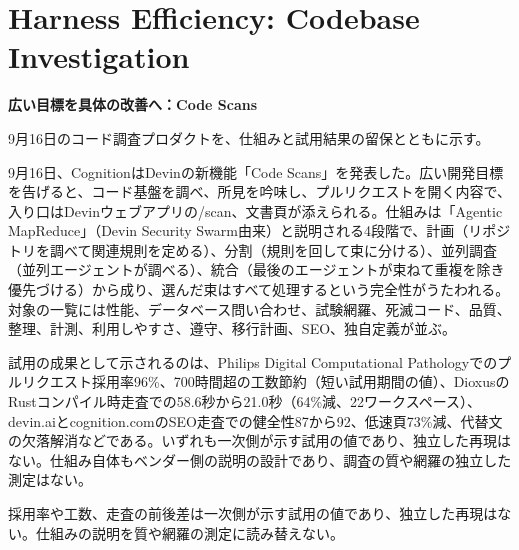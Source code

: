 \section{Harness Efficiency: Codebase Investigation}
\begin{wideflow}
{\Large\bfseries 広い目標を具体の改善へ：Code Scans}\par
\smallskip
{\color{SurveyMuted}9月16日のコード調査プロダクトを、仕組みと試用結果の留保とともに示す。}\par
\end{wideflow}

9月16日、CognitionはDevinの新機能「Code Scans」を発表した\cite{devin}。広い開発目標を告げると、コード基盤を調べ、所見を吟味し、プルリクエストを開く内容で、入り口はDevinウェブアプリの/scan、文書頁が添えられる。仕組みは「Agentic MapReduce」（Devin Security Swarm由来）と説明される4段階で、計画（リポジトリを調べて関連規則を定める）、分割（規則を回して束に分ける）、並列調査（並列エージェントが調べる）、統合（最後のエージェントが束ねて重複を除き優先づける）から成り、選んだ束はすべて処理するという完全性がうたわれる。対象の一覧には性能、データベース問い合わせ、試験網羅、死滅コード、品質、整理、計測、利用しやすさ、遵守、移行計画、SEO、独自定義が並ぶ。

試用の成果として示されるのは、Philips Digital Computational Pathologyでのプルリクエスト採用率96\%、700時間超の工数節約（短い試用期間の値）、DioxusのRustコンパイル時走査での58.6秒から21.0秒（64\%減、22ワークスペース）、devin.aiとcognition.comのSEO走査での健全性87から92、低速頁73\%減、代替文の欠落解消などである\cite{devin}。いずれも一次側が示す試用の値であり、独立した再現はない。仕組み自体もベンダー側の説明の設計であり、調査の質や網羅の独立した測定はない。

\begin{claimboundary}[試用値の境界]
採用率や工数、走査の前後差は一次側が示す試用の値であり、独立した再現はない。仕組みの説明を質や網羅の測定に読み替えない。
\end{claimboundary}
